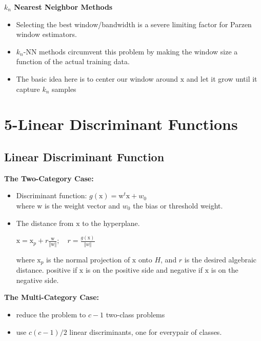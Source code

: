 \documentclass{../cheat}
\begin{document}
\begin{multicols}{3}
		\textbf{$k_n$ Nearest Neighbor Methods}
		\begin{itemize}
			\item Selecting the best window/bandwidth is a severe limiting factor for Parzen window estimators.
			\item $k_n$-NN methods circumvent this problem by making the window size a function of the actual training data.
			\item The basic idea here is to center our window around $\mathrm{x}$ and let it grow until it capture $k_n$ samples
		\end{itemize}
		
		\section{5-Linear Discriminant Functions}
		\subsection{Linear Discriminant Function}
		\textbf{The Two-Category Case:}\
		\begin{itemize}
			\item Discriminant function: $g(\mathrm{x}) = \mathrm{w}^t \mathrm{x} + w_0$\\
				where $\mathrm{w}$ is the weight vector and $w_0$ the bias or threshold weight.
			
			\item The distance from $\mathrm{x}$ to the hyperplane.\\
				\centerline{$\mathrm{x} = \mathrm{x}_p + r \frac{\mathrm{w}}{\Vert \mathrm{w} \Vert}; \quad r = \frac{g(\mathrm{x})}{\Vert w\Vert}$}
				where $\mathrm{x}_p$ is the normal projection of $\mathrm{x}$ onto $H$, and $r$ is the desired algebraic distance.
				positive if $\mathrm{x}$ is on the positive side and negative if $\mathrm{x}$ is on the negative side.
		\end{itemize}
		
		
		\textbf{The Multi-Category Case:}
		\begin{itemize}
			\item reduce the problem to $c - 1$ two-class problems
			\item use $c(c-1)/2$ linear discriminants, one for everypair of classes.
		\end{itemize}

		
		

\end{multicols}
\end{document}
